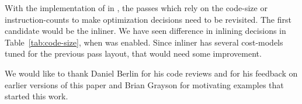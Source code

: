 \documentclass[acmlarge,review,anonymous]{acmart}\settopmatter{printfolios=true}
\begin{document}
With the implementation of \GCM{} in \LLVM{}, the passes which rely on the
code-size or instruction-counts to make optimization decisions need to be
revisited. The first candidate would be the inliner. We have seen difference
in inlining decisions in Table~\ref{tab:code-size}, when \gcm{}
was enabled.  Since inliner has several cost-models tuned for the previous
pass layout, that would need some improvement.


\begin{acks}                            %
We would like to thank Daniel Berlin for his code reviews and for his feedback
on earlier versions of this paper and Brian Grayson for motivating examples that
started this work.
\end{acks}

\newpage



\end{document}

